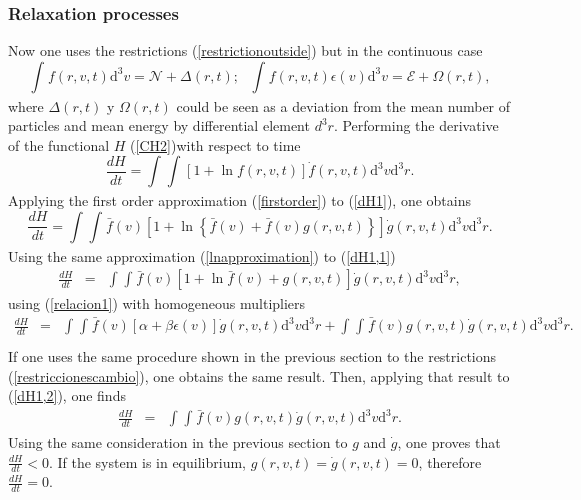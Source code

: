 \documentclass{article}
\begin{document}
\subsubsection{Relaxation processes}
Now one uses the restrictions (\ref{restrictionoutside}) but in the continuous case
\begin{equation}
    \int_{}^{}f(r,v,t)\mathrm{d}^3v=\mathcal{N}+\Delta(r,t); \ \ \ \int_{}^{}f(r,v,t)\epsilon(v)\mathrm{d}^3v=\mathcal{E}+\Omega(r,t)\label{restriccionescambio},
\end{equation}{}
where $\Delta(r,t)$ y $\Omega(r,t)$ could be seen as a deviation from the mean number of particles and mean energy by differential element $d^3r$.
Performing the derivative of the functional $H$ (\ref{CH2})with respect to time
\begin{equation}
    \frac{dH}{dt}=\int_{}^{}\int_{}^{}\left[ 1+\ln f(r,v,t) \right]\dot f(r,v,t) \mathrm{d}^3v \mathrm{d}^3r \label{dH1}.
\end{equation}{}
Applying the first order approximation (\ref{firstorder}) to (\ref{dH1}), one obtains
\begin{equation}
    \frac{dH}{dt}=\int_{}^{}\int_{}^{}\bar f(v) \left [ 1+\ln \left\{ \bar f(v)+\bar f(v)g(r,v,t) \right\} \right]\dot g(r,v,t)\mathrm{d}^3v \mathrm{d}^3r \label{dH1,1}.
\end{equation}{}
Using the same approximation (\ref{lnapproximation})
to (\ref{dH1,1}) 
\begin{eqnarray}
\frac{dH}{dt}&=&\int_{}^{} \int_{}^{} \bar f(v)\left[ 1+\ln \bar f(v)+g(r,v,t) \right]\dot g(r,v,t)\mathrm{d}^3v \mathrm{d}^3r,
\end{eqnarray}{}
using (\ref{relacion1}) with homogeneous multipliers
\begin{eqnarray}
\frac{dH}{dt}&=&\int_{}^{}\int_{}^{}\bar f(v)\left[ \alpha+\beta \epsilon(v) \right]\dot g(r,v,t)\mathrm{d}^3v \mathrm{d}^3r+\int_{}^{}\int_{}^{}\bar f(v)g(r,v,t)\dot g(r,v,t)\mathrm{d}^3v \mathrm{d}^3r \label{dH1,2}. \nonumber \\
\end{eqnarray}{}
If one uses the same procedure shown in the previous section to the restrictions (\ref{restriccionescambio}), one obtains the same result. Then, applying that result to (\ref{dH1,2}), one finds
\begin{eqnarray}
\frac{dH}{dt}&=&\int_{}^{}\int_{}^{}\bar f(v)g(r,v,t)\dot g(r,v,t)\mathrm{d}^3v \mathrm{d}^3r.
\end{eqnarray}{}
Using the same consideration in the previous section to $g$ and $\dot g$, one proves that $\frac{dH}{dt}<0$. If the system is in equilibrium, $g(r,v,t)=\dot g(r,v,t)=0$, therefore $\frac{dH}{dt}=0$. 
\end{document}
